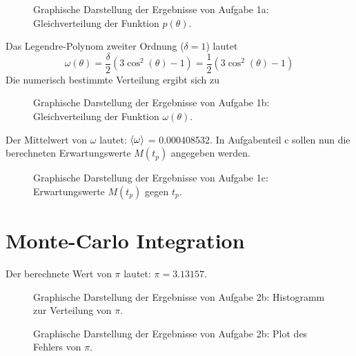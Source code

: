 \begin{landscape}
	\begin{figure}
		\caption{Graphische Darstellung der Ergebnisse von Aufgabe 1a: Gleichverteilung der Funktion $p(\theta)$.}
		\label{fig:1a}
	\end{figure}
\end{landscape}
Das Legendre-Polynom zweiter Ordnung ($\delta = 1$) lautet
\begin{equation}
	\omega(\theta) = \frac{\delta}{2} (3\cos^2(\theta)-1) = \frac{1}{2} (3\cos^2(\theta)-1)
\end{equation}
Die numerisch bestimmte Verteilung ergibt sich zu
\begin{landscape}
	\begin{figure}
		\caption{Graphische Darstellung der Ergebnisse von Aufgabe 1b: Gleichverteilung der Funktion $\omega(\theta)$.}
		\label{fig:1b}
	\end{figure}
\end{landscape}
Der Mittelwert von $\omega$ lautet: $\braket{\omega}$ = 0.000408532.
In Aufgabenteil c sollen nun die berechneten Erwartungswerte $M(t_p)$ angegeben werden.
\begin{landscape}
	\begin{figure}
		\caption{Graphische Darstellung der Ergebnisse von Aufgabe 1c: Erwartungswerte $M(t_p)$ gegen $t_p$.}
		\label{fig:1c}
	\end{figure}
\end{landscape}
\section*{Monte-Carlo Integration}
Der berechnete Wert von $\pi$ lautet: $\pi = 3.13157$.

\begin{landscape}
	\begin{figure}
		\caption{Graphische Darstellung der Ergebnisse von Aufgabe 2b: Histogramm zur Verteilung von $\pi$.}
		\label{fig:2bhist}
	\end{figure}
\end{landscape}

\begin{landscape}
	\begin{figure}
		\caption{Graphische Darstellung der Ergebnisse von Aufgabe 2b: Plot des Fehlers von $\pi$.}
		\label{fig:2bplot}
	\end{figure}
\end{landscape}

